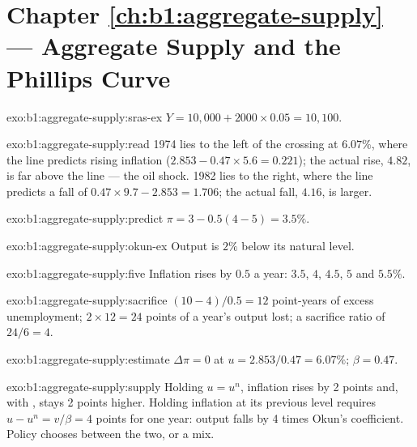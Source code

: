 \section*{Chapter \ref{ch:b1:aggregate-supply} --- Aggregate Supply and the Phillips Curve}

\begin{solution}{exo:b1:aggregate-supply:sras-ex}
$Y = 10{,}000 + 2000 \times 0.05 = 10{,}100$.
\end{solution}

\begin{solution}{exo:b1:aggregate-supply:read}
1974 lies to the left of the crossing at $6.07\%$, where the line predicts rising
inflation ($2.853 - 0.47 \times 5.6 = 0.221$); the actual rise, $4.82$, is far above the line
--- the oil shock. 1982 lies to the right, where the line predicts a fall of
$0.47 \times 9.7 - 2.853 = 1.706$; the actual fall, $4.16$, is larger.
\end{solution}

\begin{solution}{exo:b1:aggregate-supply:predict}
$\pi = 3 - 0.5(4 - 5) = 3.5\%$.
\end{solution}

\begin{solution}{exo:b1:aggregate-supply:okun-ex}
Output is $2\%$ below its natural level.
\end{solution}

\begin{solution}{exo:b1:aggregate-supply:five}
Inflation rises by $0.5$ a year: $3.5$, $4$, $4.5$, $5$ and $5.5\%$.
\end{solution}

\begin{solution}{exo:b1:aggregate-supply:sacrifice}
$(10 - 4)/0.5 = 12$ point-years of excess unemployment; $2 \times 12 = 24$ points of a
year's output lost; a sacrifice ratio of $24/6 = 4$.
\end{solution}

\begin{solution}{exo:b1:aggregate-supply:estimate}
$\Delta\pi = 0$ at $u = 2.853/0.47 = 6.07\%$; $\beta = 0.47$.
\end{solution}

\begin{solution}{exo:b1:aggregate-supply:supply}
Holding $u = u^n$, inflation rises by 2 points and, with ,
stays 2 points higher. Holding inflation at its previous level requires
$u - u^n = v/\beta = 4$ points for one year: output falls by 4 times Okun's coefficient.
Policy chooses between the two, or a mix.
\end{solution}

